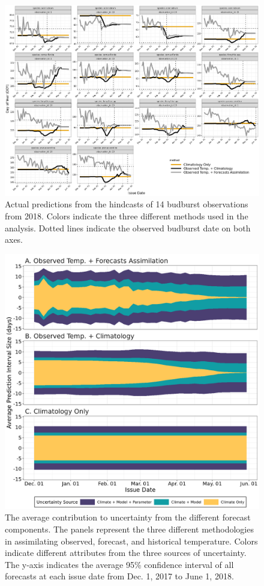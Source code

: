 \documentclass[a4paper,12pt]{article}
\begin{document}
\begin{figure}[ht]
\centering
\includegraphics[width=\linewidth]{figs/figS2_point_forecast_examples.png}
\caption{Actual predictions from the hindcasts of 14 budburst observations from 2018. Colors indicate the three different methods used in the analysis. Dotted lines indicate the observed budburst date on both axes.}
\label{figS2}
\end{figure}

\newpage

\newpage

\begin{figure}[ht]
\centering
\includegraphics[width=\linewidth]{figs/figS3_uncertainty_interval_size.png}
\caption{The average contribution to uncertainty from the different forecast components. The panels represent the three different methodologies in assimilating observed, forecast, and historical temperature. Colors indicate different attributes from the three sources of uncertainty. The y-axis indicates the average 95\% confidence interval of all forecasts at each issue date from Dec. 1, 2017 to June 1, 2018.}
\label{figS3}
\end{figure}
\end{document}
